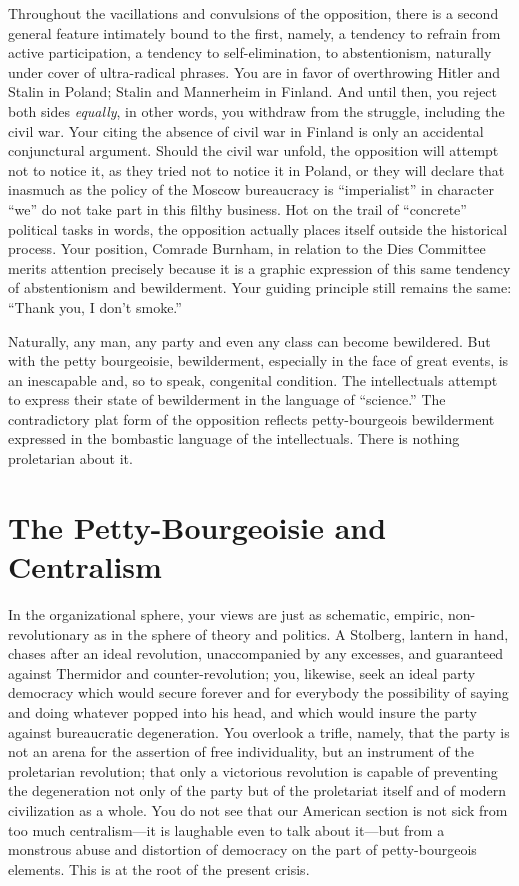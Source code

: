 Throughout the vacillations and convulsions of the opposition, there is a second general feature intimately bound to the first, namely, a tendency to refrain from active participation, a tendency to self-elimination, to abstentionism, naturally under cover of ultra-radical phrases. You are in favor of overthrowing Hitler and Stalin in Poland; Stalin and Mannerheim in Finland. And until then, you reject both sides \emph{equally}, in other words, you withdraw from the struggle, including the civil war. Your citing the absence of civil war in Finland is only an accidental conjunctural argument. Should the civil war unfold, the opposition will attempt not to notice it, as they tried not to notice it in Poland, or they will declare that inasmuch as the policy of the Moscow bureaucracy is “imperialist” in character “we” do not take part in this filthy business. Hot on the trail of “concrete” political tasks in words, the opposition actually places itself outside the historical process. Your position, Comrade Burnham, in relation to the Dies Committee merits attention precisely because it is a graphic expression of this same tendency of abstentionism and bewilderment. Your guiding principle still remains the same: “Thank you, I don’t smoke.”

Naturally, any man, any party and even any class can become bewildered. But with the petty bourgeoisie, bewilderment, especially in the face of great events, is an inescapable and, so to speak, congenital condition. The intellectuals attempt to express their state of bewilderment in the language of “science.” The contradictory plat form of the opposition reflects petty-bourgeois bewilderment expressed in the bombastic language of the intellectuals. There is nothing proletarian about it.

\enlargethispage{-1 \baselineskip}

\section*{The Petty-Bourgeoisie and Centralism}

In the organizational sphere, your views are just as schematic, empiric, non-revolutionary as in the sphere of theory and politics. A Stolberg, lantern in hand, chases after an ideal revolution, unaccompanied by any excesses, and guaranteed against Thermidor and counter-revolution; you, likewise, seek an ideal party democracy which would secure forever and for everybody the possibility of saying and doing whatever popped into his head, and which would insure the party against bureaucratic degeneration. You overlook a trifle, namely, that the party is not an arena for the assertion of free individuality, but an instrument of the proletarian revolution; that only a victorious revolution is capable of preventing the degeneration not only of the party but of the proletariat itself and of modern civilization as a whole. You do not see that our American section is not sick from too much centralism---it is laughable even to talk about it---but from a monstrous abuse and distortion of democracy on the part of petty-bourgeois elements. This is at the root of the present crisis.

